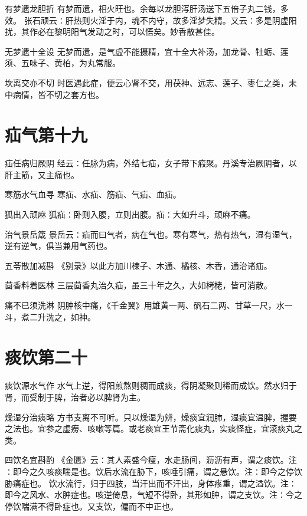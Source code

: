 \documentclass[a4paper,12pt,UTF8,twoside]{ctexbook}
\begin{document}
    有梦遗龙胆折
    有梦而遗，相火旺也。余每以龙胆泻肝汤送下五倍子丸二钱，多效。
    张石顽云∶肝热则火淫于内，魂不内守，故多淫梦失精。又云∶多是阴虚阳扰，其作必在黎明阳气发动之时，可以悟矣。妙香散甚佳。
    
    无梦遗十全设
    无梦而遗，是气虚不能摄精，宜十全大补汤，加龙骨、牡蛎、莲须、五味子、黄柏，为丸常服。
    
    坎离交亦不切
    时医遇此症，便云心肾不交，用茯神、远志、莲子、枣仁之类，未中病情，皆不切之套方也。
    
    \chapter{疝气第十九}
      疝任病归厥阴
    经云∶任脉为病，外结七疝，女子带下瘕聚。丹溪专治厥阴者，以肝主筋，又主痛也。
    
    寒筋水气血寻
    寒疝、水疝、筋疝、气疝、血疝。
    
    狐出入顽麻
    狐疝∶卧则入腹，立则出腹。疝∶大如升斗，顽麻不痛。
    
    治气景岳箴
    景岳云∶疝而曰气者，病在气也。寒有寒气，热有热气，湿有湿气，逆有逆气，俱当兼用气药也。
    
    五苓散加减斟
    《别录》以此方加川楝子、木通、橘核、木香，通治诸疝。
    
    茴香料着医林
    三层茴香丸治久疝，虽三十年之久，大如栲栳，皆可消散。
    
    痛不已须洗淋
    阴肿核中痛，《千金翼》用雄黄一两、矾石二两、甘草一尺，水一斗，煮二升洗之，如神。
    
    
    
    \chapter{痰饮第二十}
        
    痰饮源水气作
    水气上逆，得阳煎熬则稠而成痰，得阴凝聚则稀而成饮。然水归于肾，而受制于脾，治者必以脾肾为主。
    
    燥湿分治痰略
    方书支离不可听。只以燥湿为辨，燥痰宜润肺，湿痰宜温脾，握要之法也。宜参之虚痨、咳嗽等篇。或老痰宜王节斋化痰丸，实痰怪症，宜滚痰丸之类。
    
    四饮名宜斟酌
    《金匮》云∶其人素盛今瘦，水走肠间，沥沥有声，谓之痰饮。注∶即今之久咳痰喘是也。饮后水流在胁下，咳唾引痛，谓之悬饮。注∶即今之停饮胁痛症也。
    饮水流行，归于四肢，当汗出而不汗出，身体疼重，谓之溢饮。注∶即今之风水、水肿症也。咳逆倚息，气短不得卧，其形如肿，谓之支饮。注∶今之停饮喘满不得卧症也。又支饮，偏而不中正也。
    
\end{document}
